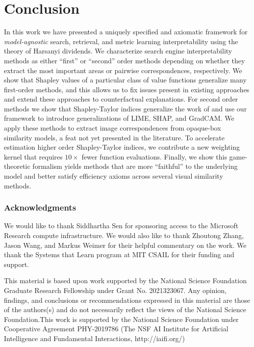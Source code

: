 \documentclass{article} %
\begin{document}
\section{Conclusion}
\vspace{-.1in}
In this work we have presented a uniquely specified and axiomatic framework for \textit{model-agnostic} search, retrieval, and metric learning interpretability using the theory of Harsanyi dividends. We characterize search engine interpretability methods as either ``first'' or ``second'' order methods depending on whether they extract the most important areas or pairwise correspondences, respectively. We show that Shapley values of a particular class of value functions generalize many first-order methods, and this allows us to fix issues present in existing approaches and extend these approaches to counterfactual explanations. For second order methods we show that Shapley-Taylor indices generalize the work of \cite{vedml} and use our framework to introduce generalizations of LIME, SHAP, and GradCAM. We apply these methods to extract image correspondences from opaque-box similarity models, a feat not yet presented in the literature. To accelerate estimation higher order Shapley-Taylor indices, we contribute a new weighting kernel that requires $10\times$ fewer function evaluations. Finally, we show this game-theoretic formalism yields methods that are more ``faithful'' to the underlying model and better satisfy efficiency axioms across several visual similarity methods. 


\subsubsection*{Acknowledgments}

We would like to thank Siddhartha Sen for sponsoring access to the Microsoft Research compute infrastructure. We would also like to thank Zhoutong Zhang, Jason Wang, and Markus Weimer for their helpful commentary on the work. We thank the Systems that Learn program at MIT CSAIL for their funding and support. 

This material is based upon work supported by the National Science Foundation Graduate Research Fellowship under Grant No. 2021323067. Any opinion, findings, and conclusions or recommendations expressed in this material are those of the authors(s) and do not necessarily reflect the views of the National Science Foundation.This work is supported by the National Science Foundation under Cooperative Agreement PHY-2019786 (The NSF AI Institute for Artificial Intelligence and Fundamental Interactions, http://iaifi.org/)
\end{document}
